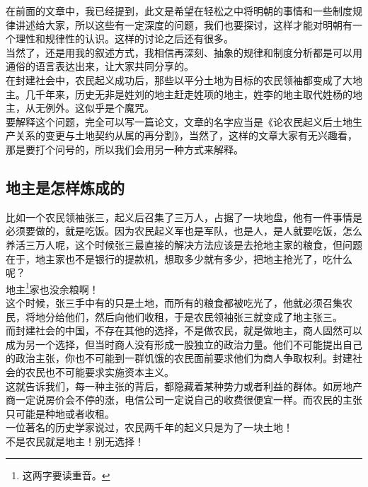 \begin{multicols}{\theparacolNo}
在前面的文章中，我已经提到，此文是希望在轻松之中将明朝的事情和一些制度规律讲述给大家，所以这些有一定深度的问题，我们也要探讨，这样才能对明朝有一个理性和规律性的认识。这样的讨论之后还有很多。\\

当然了，还是用我的叙述方式，我相信再深刻、抽象的规律和制度分析都是可以用通俗的语言表达出来，让大家共同分享的。\\

在封建社会中，农民起义成功后，那些以平分土地为目标的农民领袖都变成了大地主。几千年来，历史无非是姓刘的地主赶走姓项的地主，姓李的地主取代姓杨的地主，从无例外。这似乎是个魔咒。\\

要解释这个问题，完全可以写一篇论文，文章的名字应当是《论农民起义后土地生产关系的变更与土地契约从属的再分割》，当然了，这样的文章大家有无兴趣看，那是要打个问号的，所以我们会用另一种方式来解释。\\

\subsection{地主是怎样炼成的}
比如一个农民领袖张三，起义后召集了三万人，占据了一块地盘，他有一件事情是必须要做的，就是吃饭。因为农民起义军也是军队，也是人，是人就要吃饭，怎么养活三万人呢，这个时候张三最直接的解决方法应该是去抢地主家的粮食，但问题在于，地主家也不是银行的提款机，想取多少就有多少，把地主抢光了，吃什么呢？\\

地主\footnote{这两字要读重音。}家也没余粮啊！\\

这个时候，张三手中有的只是土地，而所有的粮食都被吃光了，他就必须召集农民，将地分给他们，然后向他们收租，于是农民领袖张三就变成了地主张三。\\

而封建社会的中国，不存在其他的选择，不是做农民，就是做地主，商人固然可以成为另一个选择，但当时商人没有形成一股独立的政治力量。他们不可能提出自己的政治主张，你也不可能到一群饥饿的农民面前要求他们为商人争取权利。封建社会的农民也不可能要求实施资本主义。\\

这就告诉我们，每一种主张的背后，都隐藏着某种势力或者利益的群体。如房地产商一定说房价会不停的涨，电信公司一定说自己的收费很便宜一样。而农民的主张只可能是种地或者收租。\\

一位著名的历史学家说过，农民两千年的起义只是为了一块土地！\\

不是农民就是地主！别无选择！\\
\ifnum{}
	\end{multicols}
\fi
\newpage
